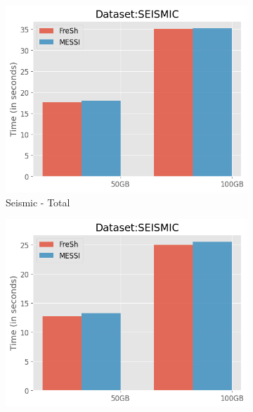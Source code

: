 
\begin{figure}[htbp]
    \centering
    \begin{subfigure}{0.48\textwidth}
        \includegraphics[width=\textwidth]{figures/Experiments/scale-dataset-seismic-total.png}
        \caption{Seismic - Total}
        \label{fig:eval:scale-dataset:seismic:total}
    \end{subfigure}
    \begin{subfigure}{0.48\textwidth}
        \includegraphics[width=\textwidth]{figures/Experiments/scale-dataset-seismic-query.png}

\end{subfigure}
\end{figure}
